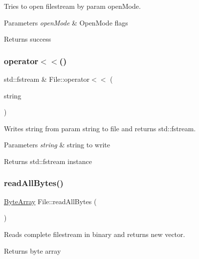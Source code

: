 Tries to open filestream by param open\+Mode. 


\begin{DoxyParams}{Parameters}
{\em open\+Mode} & Open\+Mode flags \\
\hline
\end{DoxyParams}
\begin{DoxyReturn}{Returns}
success 
\end{DoxyReturn}
\mbox{\label{class_file_ac58f65f7af68645c95050e0faa296bcd}} 
\subsubsection{\texorpdfstring{operator$<$$<$()}{operator<<()}}
{\footnotesize\ttfamily std\+::fstream \& File\+::operator$<$$<$ (\begin{DoxyParamCaption}\item[{const \mbox{\hyperlink{class_a_string}{A\+String}} \&}]{string }\end{DoxyParamCaption})}



Writes string from param string to file and returns std\+::fstream. 


\begin{DoxyParams}{Parameters}
{\em string} & string to write \\
\hline
\end{DoxyParams}
\begin{DoxyReturn}{Returns}
std\+::fstream instance 
\end{DoxyReturn}
\mbox{\label{class_file_acc44c7f319708f0e378c08492d178fc0}} 
\subsubsection{\texorpdfstring{readAllBytes()}{readAllBytes()}}
{\footnotesize\ttfamily \mbox{\hyperlink{class_byte_array}{Byte\+Array}} File\+::read\+All\+Bytes (\begin{DoxyParamCaption}{ }\end{DoxyParamCaption})}



Reads complete filestream in binary and returns new vector. 

\begin{DoxyReturn}{Returns}
byte array 
\end{DoxyReturn}
\mbox{\label{class_file_ad835c603c110f5e5d8359a9b271298dd}} 
